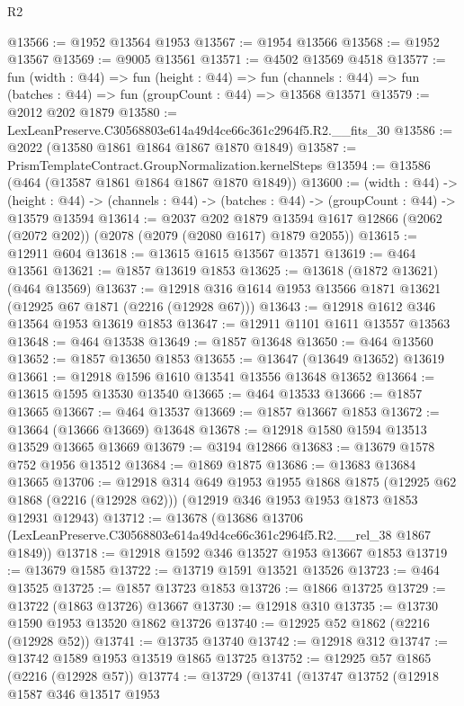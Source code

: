 \begin{lexlean}{R2}
\begin{coremodule}
@13566 := @1952 @13564 @1953
@13567 := @1954 @13566
@13568 := @1952 @13567
@13569 := @9005 @13561
@13571 := @4502 @13569 @4518
@13577 := fun (width : @44) =>
  fun (height : @44) =>
  fun (channels : @44) => fun (batches : @44) => fun (groupCount : @44) => @13568 @13571
@13579 := @2012 @202 @1879
@13580 := LexLeanPreserve.C30568803e614a49d4ce66c361c2964f5.R2.__fits_30
@13586 := @2022 (@13580 @1861 @1864 @1867 @1870 @1849)
@13587 := PrismTemplateContract.GroupNormalization.kernelSteps
@13594 := @13586 (@464 (@13587 @1861 @1864 @1867 @1870 @1849))
@13600 := (width : @44) ->
  (height : @44) -> (channels : @44) -> (batches : @44) -> (groupCount : @44) -> @13579 @13594
@13614 := @2037
    @202
    @1879
    @13594
    @1617
    @12866
    (@2062 (@2072 @202))
    (@2078 (@2079 (@2080 @1617) @1879 @2055))
@13615 := @12911 @604
@13618 := @13615 @1615 @13567 @13571
@13619 := @464 @13561
@13621 := @1857 @13619 @1853
@13625 := @13618 (@1872 @13621) (@464 @13569)
@13637 := @12918 @316 @1614 @1953 @13566 @1871 @13621 (@12925 @67 @1871 (@2216 (@12928 @67)))
@13643 := @12918 @1612 @346 @13564 @1953 @13619 @1853
@13647 := @12911 @1101 @1611 @13557 @13563
@13648 := @464 @13538
@13649 := @1857 @13648
@13650 := @464 @13560
@13652 := @1857 @13650 @1853
@13655 := @13647 (@13649 @13652) @13619
@13661 := @12918 @1596 @1610 @13541 @13556 @13648 @13652
@13664 := @13615 @1595 @13530 @13540
@13665 := @464 @13533
@13666 := @1857 @13665
@13667 := @464 @13537
@13669 := @1857 @13667 @1853
@13672 := @13664 (@13666 @13669) @13648
@13678 := @12918 @1580 @1594 @13513 @13529 @13665 @13669
@13679 := @3194 @12866
@13683 := @13679 @1578 @752 @1956 @13512
@13684 := @1869 @1875
@13686 := @13683 @13684 @13665
@13706 := @12918
    @314
    @649
    @1953
    @1955
    @1868
    @1875
    (@12925 @62 @1868 (@2216 (@12928 @62)))
    (@12919 @346 @1953 @1953 @1873 @1853 @12931 @12943)
@13712 := @13678
    (@13686 @13706 (LexLeanPreserve.C30568803e614a49d4ce66c361c2964f5.R2.__rel_38 @1867 @1849))
@13718 := @12918 @1592 @346 @13527 @1953 @13667 @1853
@13719 := @13679 @1585
@13722 := @13719 @1591 @13521 @13526
@13723 := @464 @13525
@13725 := @1857 @13723 @1853
@13726 := @1866 @13725
@13729 := @13722 (@1863 @13726) @13667
@13730 := @12918 @310
@13735 := @13730 @1590 @1953 @13520 @1862 @13726
@13740 := @12925 @52 @1862 (@2216 (@12928 @52))
@13741 := @13735 @13740
@13742 := @12918 @312
@13747 := @13742 @1589 @1953 @13519 @1865 @13725
@13752 := @12925 @57 @1865 (@2216 (@12928 @57))
@13774 := @13729
    (@13741
      (@13747
        @13752
        (@12918
          @1587
          @346
          @13517
          @1953

\end{coremodule}
\end{lexlean}
